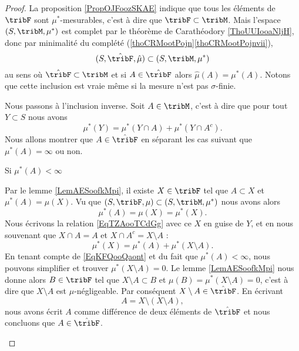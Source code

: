 \begin{proof}
    La proposition \ref{PropOJFoozSKAE} indique que tous les éléments de \( \tribF\) sont \( \mu^*\)-mesurables, c'est à dire que \( \tribF\subset \tribM\). Mais l'espace \( (S,\tribM,\mu^*)\) est complet par le théorème de Carathéodory \ref{ThoUUIooaNljH}, donc par minimalité du complété (\ref{thoCRMootPojn}\ref{thoCRMootPojnvii}),
    \begin{equation}
        (S,\hat\tribF,\hat\mu)\subset(S,\tribM,\mu^*)
    \end{equation}
    au sens où \( \hat\tribF\subset\tribM\) et si \( A\in\hat\tribF\) alors \( \hat\mu(A)=\mu^*(A)\). Notons que cette inclusion est vraie même si la mesure n'est pas \( \sigma\)-finie.

    Nous passons à l'inclusion inverse. Soit \( A\in\tribM\), c'est à dire que pour tout \( Y\subset S\) nous avons
    \begin{equation}    \label{EqTZAooTCdGg}
        \mu^*(Y)=\mu^*(Y\cap A)+\mu^*(Y\cap A^c).
    \end{equation}
    Nous allons montrer que \( A\in\hat\tribF\) en séparant les cas suivant que \( \mu^*(A)=\infty\) ou non.

    \begin{subproof}
        \item[Si \( \mu^*(A)<\infty\)] 
        
        Par le lemme \ref{LemAESoofkMpi}, il existe \( X\in\tribF\) tel que \( A\subset X\) et \( \mu^*(A)=\mu(X)\). Vu que \( (S,\tribF,\mu)\subset (S,\tribM,\mu^*)\) nous avons alors
        \begin{equation}    \label{EqKFQooQaont}
            \mu^*(A)=\mu(X)=\mu^*(X).
        \end{equation}
        Nous écrivons la relation \eqref{EqTZAooTCdGg} avec ce \( X\) en guise de \( Y\), et en nous souvenant que \( X\cap A=A\) et \( X\cap A^c=X\setminus A\) :
        \begin{equation}
            \mu^*(X)=\mu^*(A)+\mu^*(X\setminus A).
        \end{equation}
        En tenant compte de \eqref{EqKFQooQaont} et du fait que \( \mu^*(A)<\infty\), nous pouvons simplifier et trouver \( \mu^*(X\setminus A)=0\). Le lemme \ref{LemAESoofkMpi} nous donne alors \( B\in\tribF\) tel que \( X\setminus A\subset B\) et \( \mu(B)=\mu^*(X\setminus A)=0\), c'est à dire que \( X\setminus A\) est \( \mu\)-négligeable. Par conséquent \( X\setminus A\in\hat\tribF\). En écrivant
        \begin{equation}
            A=X\setminus(X\setminus A),
        \end{equation}
        nous avons écrit \( A\) comme différence de deux éléments de \( \hat\tribF\) et nous concluons que \( A\in\hat\tribF\).
        

\end{subproof}
\end{proof}
